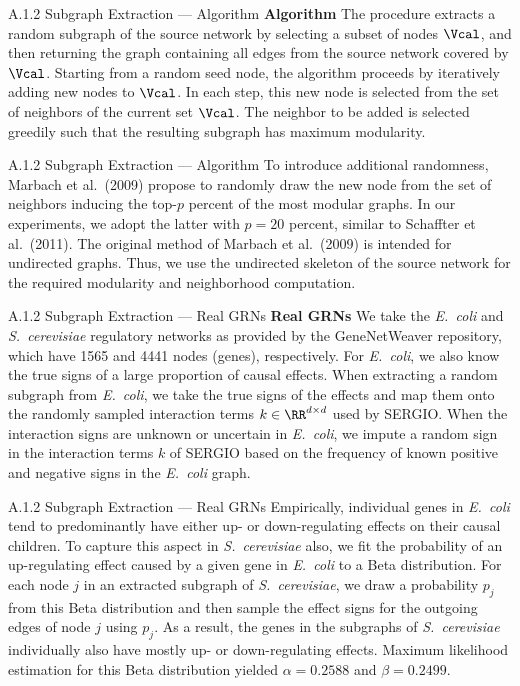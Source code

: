 \documentclass[aspectratio=169,10pt]{beamer}
\newcommand{\sergio}{{SERGIO}\xspace}
\newcommand{\gnw}{{GeneNetWeaver}\xspace}
\newcommand{\ecoli}{{\em E.\ coli}\xspace}
\newcommand{\yeast}{{\em S.\ cerevisiae}\xspace}
\begin{document}
\begin{frame}{A.1.2 Subgraph Extraction --- Algorithm}
\textbf{Algorithm}\quad
The procedure extracts a random subgraph of the source network by selecting a subset of nodes $\Vcal$, and then returning the graph containing all edges from the source network covered by $\Vcal$. Starting from a random seed node, the algorithm proceeds by iteratively adding new nodes to $\Vcal$. In each step, this new node is selected from the set of neighbors of the current set $\Vcal$. The neighbor to be added is selected greedily such that the resulting subgraph has maximum modularity.
\end{frame}

\begin{frame}{A.1.2 Subgraph Extraction --- Algorithm}
To introduce additional randomness, Marbach et al.\ (2009) propose to randomly draw the new node from the set of neighbors inducing the top-$p$ percent of the most modular graphs. In our experiments, we adopt the latter with $p=20$ percent, similar to Schaffter et al.\ (2011). The original method of Marbach et al.\ (2009) is intended for undirected graphs. Thus, we use the undirected skeleton of the source network for the required modularity and neighborhood computation.
\end{frame}

\begin{frame}{A.1.2 Subgraph Extraction --- Real GRNs}
\small
\textbf{Real GRNs}\quad
We take the \ecoli and \yeast regulatory networks as provided by the \gnw repository, which have \num{1565} and \num{4441} nodes (genes), respectively. For \ecoli, we also know the true signs of a large proportion of causal effects. When extracting a random subgraph from \ecoli, we take the true signs of the effects and map them onto the randomly sampled interaction terms $k \in \RR^{d \times d}$ used by \sergio. When the interaction signs are unknown or uncertain in \ecoli, we impute a random sign in the interaction terms $k$ of \sergio based on the frequency of known positive and negative signs in the \ecoli graph.
\end{frame}

\begin{frame}{A.1.2 Subgraph Extraction --- Real GRNs}
\small
Empirically, individual genes in \ecoli tend to predominantly have either up- or down-regulating effects on their causal children. To capture this aspect in \yeast also, we fit the probability of an up-regulating effect caused by a given gene in \ecoli to a Beta distribution. For each node $j$ in an extracted subgraph of \yeast, we draw a probability $p_j$ from this Beta distribution and then sample the effect signs for the outgoing edges of node $j$ using $p_j$. As a result, the genes in the subgraphs of \yeast individually also have mostly up- or down-regulating effects. Maximum likelihood estimation for this Beta distribution yielded $\alpha = 0.2588$ and $\beta = 0.2499$.
\end{frame}
\end{document}
